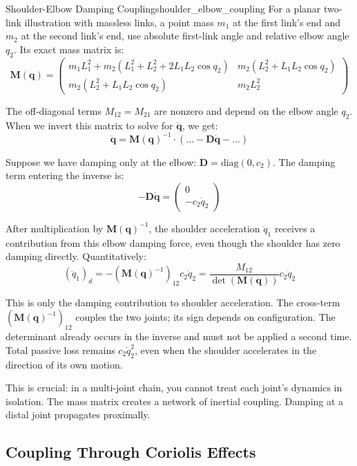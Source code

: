 \begin{example}{Shoulder-Elbow Damping Coupling}{shoulder_elbow_coupling}
For a planar two-link illustration with massless links, a point mass $m_1$ at the first link's end and $m_2$ at the second link's end, use absolute first-link angle and relative elbow angle $q_2$. Its exact mass matrix is:
\[
\mathbf{M}(\mathbf{q}) = \begin{pmatrix} m_1 L_1^2 + m_2(L_1^2 + L_2^2 + 2L_1 L_2 \cos q_2) & m_2(L_2^2 + L_1 L_2 \cos q_2) \\ m_2(L_2^2 + L_1 L_2 \cos q_2) & m_2 L_2^2 \end{pmatrix}
\]

The off-diagonal terms $M_{12} = M_{21}$ are nonzero and depend on the elbow angle $q_2$. When we invert this matrix to solve for $\ddot{\bm{q}}$, we get:
\[
\ddot{\bm{q}} = \mathbf{M}(\mathbf{q})^{-1} \cdot (\ldots - \bm{D}\dot{\bm{q}} - \ldots)
\]

Suppose we have damping only at the elbow: $\bm{D} = \text{diag}(0, c_2)$. The damping term entering the inverse is:
\[
-\bm{D}\dot{\bm{q}} = \begin{pmatrix} 0 \\ -c_2 \dot{q}_2 \end{pmatrix}
\]

After multiplication by $\mathbf{M}(\mathbf{q})^{-1}$, the shoulder acceleration $\ddot{q}_1$ receives a contribution from this elbow damping force, even though the shoulder has zero damping directly. Quantitatively:
\[
(\ddot{q}_1)_d = -(\mathbf{M}(\mathbf{q})^{-1})_{12}c_2\dot{q}_2 = \frac{M_{12}}{\det(\mathbf{M}(\mathbf{q}))}c_2\dot{q}_2
\]

This is only the damping contribution to shoulder acceleration. The cross-term \((\mathbf{M}(\mathbf{q})^{-1})_{12}\) couples the two joints; its sign depends on configuration. The determinant already occurs in the inverse and must not be applied a second time. Total passive loss remains \(c_2\dot q_2^2\), even when the shoulder accelerates in the direction of its own motion.
\end{example}

This is crucial: in a multi-joint chain, you cannot treat each joint's dynamics in isolation. The mass matrix creates a network of inertial coupling. Damping at a distal joint propagates proximally.

\subsection{Coupling Through Coriolis Effects}\label{coupling-through-coriolis-effects}

